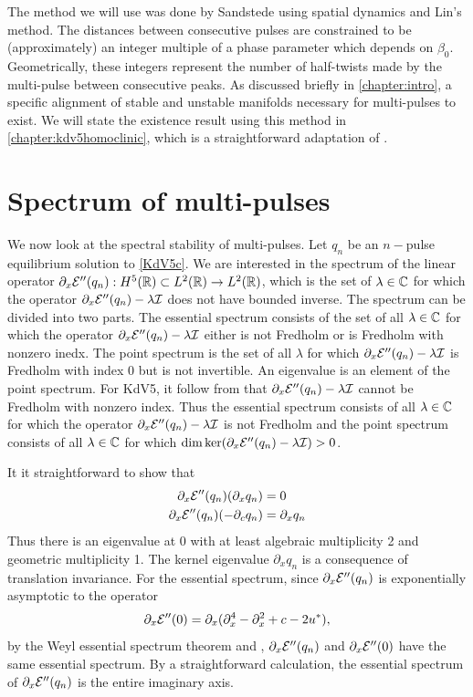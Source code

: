 \documentclass[thesis.tex]{subfiles}
\begin{document}
The method we will use was done by Sandstede \cite{Sandstede1993,SandstedeStrut} using spatial dynamics and Lin's method. The distances between consecutive pulses are constrained to be (approximately) an integer multiple of a phase parameter which depends on $\beta_0$. Geometrically, these integers represent the number of half-twists made by the multi-pulse between consecutive peaks. As discussed briefly in \cref{chapter:intro}, a specific alignment of stable and unstable manifolds necessary for multi-pulses to exist. We will state the existence result using this method in \cref{chapter:kdv5homoclinic}, which is a straightforward adaptation of \cite[Theorem 3.6]{SandstedeStrut}. 

\section{Spectrum of multi-pulses}

We now look at the spectral stability of multi-pulses. Let $q_n$ be an $n-$pulse equilibrium solution to \cref{KdV5c}. We are interested in the spectrum of the linear operator $\partial_x \mathcal{E}''(q_n): H^5(\mathbb{R}) \subset L^2(\mathbb{R}) \rightarrow L^2(\mathbb{R})$, which is the set of $\lambda \in \mathbb{C}$ for which the operator $\partial_x \mathcal{E}''(q_n) - \lambda \mathcal{I}$ does not have bounded inverse. The spectrum can be divided into two parts. The essential spectrum consists of the set of all $\lambda \in \mathbb{C}$ for which the operator $\partial_x \mathcal{E}''(q_n) - \lambda \mathcal{I}$ either is not Fredholm or is Fredholm with nonzero inedx. The point spectrum is the set of all $\lambda$ for which $\partial_x \mathcal{E}''(q_n) - \lambda \mathcal{I}$ is Fredholm with index 0 but is not invertible. An eigenvalue is an element of the point spectrum. For KdV5, it follow from \cite[Theorem 3.1.11]{Kapitula2013} that $\partial_x \mathcal{E}''(q_n) - \lambda \mathcal{I}$ cannot be Fredholm with nonzero index. Thus the essential spectrum consists of all $\lambda \in \mathbb{C}$ for which the operator $\partial_x \mathcal{E}''(q_n) - \lambda \mathcal{I}$ is not Fredholm and the point spectrum consists of all $\lambda \in \mathbb{C}$ for which $\mathop\mathrm{dim}\nolimits \mathop\mathrm{ker}\nolimits(\partial_x \mathcal{E}''(q_n) - \lambda \mathcal{I}) > 0$.

It it straightforward to show that 
\begin{align*}
\partial_x \mathcal{E}''(q_n) (\partial_x q_n) &= 0 \\
\partial_x \mathcal{E}''(q_n) (-\partial_c q_n) &= \partial_x q_n
\end{align*}
Thus there is an eigenvalue at 0 with at least algebraic multiplicity 2 and geometric multiplicity 1. The kernel eigenvalue $\partial_x q_n$ is a consequence of translation invariance. For the essential spectrum, since $\partial_x \mathcal{E}''(q_n)$ is exponentially asymptotic to the operator 
\[
\partial_x \mathcal{E}''(0) = 
\partial_x(\partial_x^4 - \partial_x^2 + c - 2 u^*),
\]
by the Weyl essential spectrum theorem \cite[Theorem 2.2.6]{Kapitula2013} and \cite[Theorem 3.1.11]{Kapitula2013}, $\partial_x \mathcal{E}''(q_n)$ and $\partial_x \mathcal{E}''(0)$ have the same essential spectrum. By a straightforward calculation, the essential spectrum of $\partial_x \mathcal{E}''(q_n)$ is the entire imaginary axis.
\end{document}
